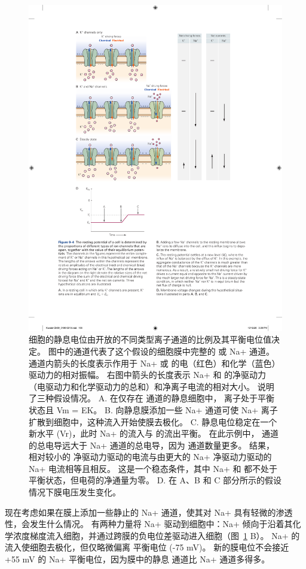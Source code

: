 \begin{figure}[htbp]
	\centering
	\includegraphics[width=0.7\linewidth]{chap09/fig_9_4}
	\caption{细胞的静息电位由开放的不同类型离子通道的比例及其平衡电位值决定。 图中的通道代表了这个假设的细胞膜中完整的  或 Na+ 通道。 通道内箭头的长度表示作用于 Na+ 或  的电（红色）和化学（蓝色）驱动力的相对振幅。 右图中箭头的长度表示 Na+ 和  的净驱动力（电驱动力和化学驱动力的总和）和净离子电流的相对大小。 说明了三种假设情况。 A. 在仅存在  通道的静息细胞中， 离子处于平衡状态且 Vm = EK。 B. 向静息膜添加一些 Na+ 通道可使 Na+ 离子扩散到细胞中，这种流入开始使膜去极化。 C. 静息电位稳定在一个新水平 (Vr)，此时 Na+ 的流入与  的流出平衡。 在此示例中， 通道的总电导远大于 Na+ 通道的总电导，因为  通道数量更多。 结果，相对较小的  净驱动力驱动的电流与由更大的 Na+ 净驱动力驱动的 Na+ 电流相等且相反。 这是一个稳态条件，其中 Na+ 和  都不处于平衡状态，但电荷的净通量为零。 D. 在 A、B 和 C 部分所示的假设情况下膜电压发生变化。}
	\label{fig:9_4}
\end{figure}


现在考虑如果在膜上添加一些静止的 Na+ 通道，使其对 Na+ 具有轻微的渗透性，会发生什么情况。
有两种力量将 Na+ 驱动到细胞中：Na+ 倾向于沿着其化学浓度梯度流入细胞，并通过跨膜的负电位差驱动进入细胞（图~\ref{fig:9_4} B）。
Na+ 的流入使细胞去极化，但仅略微偏离  平衡电位 (-75 mV)。
新的膜电位不会接近 +55 mV 的 Na+ 平衡电位，因为膜中的静息  通道比 Na+ 通道多得多。


